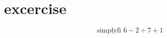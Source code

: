 \documentclass[12pt]{article}
\begin{document}
\section{excercise }

$$ \text{simplyfi } 6 - 2 \div 7 + 1 $$
\end{document}
